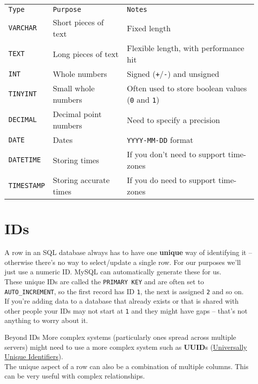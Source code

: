 \begin{small}
    \begin{tabularx}{\textwidth}{l l X}
        \texttt{Type}       & \texttt{Purpose}       & \texttt{Notes} \\
        \texttt{VARCHAR}    & Short pieces of text   & Fixed length  \\
        \texttt{TEXT}       & Long pieces of text    & Flexible length, with performance hit  \\
        \texttt{INT}        & Whole numbers          & Signed (\texttt{+}/\texttt{-}) and unsigned  \\
        \texttt{TINYINT}    & Small whole numbers    & Often used to store boolean values (\texttt{0} and \texttt{1})  \\
        \texttt{DECIMAL}    & Decimal point numbers  & Need to specify a precision \\
        \texttt{DATE}       & Dates                  & \texttt{YYYY-MM-DD} format  \\
        \texttt{DATETIME}   & Storing times          & If you don't need to support time-zones \\
        \texttt{TIMESTAMP}  & Storing accurate times & If you do need to support time-zones \\
    \end{tabularx}
\end{small}
\par\bigskip


\section{IDs}

A row in an SQL database always has to have one \textbf{unique} way of identifying it – otherwise there's no way to select/update a single row. For our purposes we'll just use a numeric ID. MySQL can automatically generate these for us.
\\

These unique IDs are called the \texttt{PRIMARY KEY} and are often set to \texttt{AUTO\_INCREMENT}, so the first record has ID \texttt{1}, the next is assigned \texttt{2} and so on.
\\

If you're adding data to a database that already exists or that is shared with other people your IDs may not start at \texttt{1} and they might have gaps – that's not anything to worry about it.

\begin{infobox}{Beyond IDs}
    More complex systems (particularly ones spread across multiple servers) might need to use a more complex system such as \textbf{UUID}s (\href{https://en.wikipedia.org/wiki/Universally\_unique\_identifier}{Universally Unique Identifiers}).
    \\

    The unique aspect of a row can also be a combination of multiple columns. This can be very useful with complex relationships.
\end{infobox}

